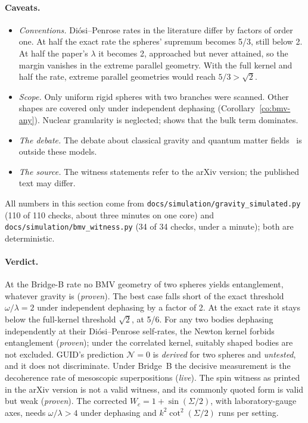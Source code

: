 \paragraph{Caveats.}
\begin{itemize}[nosep]
\item \emph{Conventions.} Di\'osi--Penrose rates in the literature differ by factors of order one. At half the exact rate the spheres'
supremum becomes 5/3, still below 2. At half the paper's $\lambda$ it becomes 2, approached but never attained, so the margin vanishes in the
extreme parallel geometry. With the full kernel and half the rate, extreme parallel geometries would reach $5/3>\sqrt2$.
\item \emph{Scope.} Only uniform rigid spheres with two branches were scanned. Other shapes are covered only under independent dephasing
(Corollary~\ref{co:bmv-any}). Nuclear granularity is neglected;  shows that the bulk term dominates.
\item \emph{The debate.} The debate about classical gravity and quantum matter fields~\cite{azizhowl,movw,diosi25} is outside these models.
\item \emph{The source.} The witness statements refer to the arXiv version; the published text may differ.
\end{itemize}

All numbers in this section come from \texttt{docs/simulation/gravity\_simulated.py} (110 of 110 checks, about three minutes on one core)
and \texttt{docs/simulation/bmv\_witness.py} (34 of 34 checks, under a minute); both are deterministic.

\paragraph{Verdict.} At the Bridge-B rate no BMV geometry of two spheres yields entanglement, whatever gravity is (\emph{proven}). The best
case falls short of the exact threshold $\omega/\lambda=2$ under independent dephasing by a factor of 2. At the exact rate it stays below the
full-kernel threshold $\sqrt2$, at 5/6. For any two bodies dephasing independently at their Di\'osi--Penrose self-rates, the Newton kernel
forbids entanglement (\emph{proven}); under the correlated kernel, suitably shaped bodies are not excluded. GUID's prediction $\mathcal N=0$
is \emph{derived} for two spheres and \emph{untested}, and it does not discriminate. Under Bridge~B the decisive measurement is the
decoherence rate of mesoscopic superpositions (\emph{live}). The spin witness as printed in the arXiv version is not a valid witness, and its
commonly quoted form is valid but weak (\emph{proven}). The corrected $W_c=1+\sin(\Sigma/2)$, with laboratory-gauge axes, needs
$\omega/\lambda>4$ under dephasing and $k^2\cot^2(\Sigma/2)$ runs per setting.
